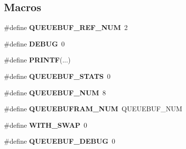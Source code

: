 \subsection*{Macros}
\begin{DoxyCompactItemize}
\item 
\hypertarget{group__rimequeuebuf_ga95d59c9802dfe6307e7742b0ca9d54b3}{}\#define {\bfseries Q\+U\+E\+U\+E\+B\+U\+F\+\_\+\+R\+E\+F\+\_\+\+N\+U\+M}~2\label{group__rimequeuebuf_ga95d59c9802dfe6307e7742b0ca9d54b3}

\item 
\hypertarget{group__rimequeuebuf_gad72dbcf6d0153db1b8d8a58001feed83}{}\#define {\bfseries D\+E\+B\+U\+G}~0\label{group__rimequeuebuf_gad72dbcf6d0153db1b8d8a58001feed83}

\item 
\hypertarget{group__rimequeuebuf_ga1f464e950a4fa11e8821b5c725921a15}{}\#define {\bfseries P\+R\+I\+N\+T\+F}(...)\label{group__rimequeuebuf_ga1f464e950a4fa11e8821b5c725921a15}

\item 
\hypertarget{group__rimequeuebuf_ga76f25cfbf0138249b597fddf41a2c8d5}{}\#define {\bfseries Q\+U\+E\+U\+E\+B\+U\+F\+\_\+\+S\+T\+A\+T\+S}~0\label{group__rimequeuebuf_ga76f25cfbf0138249b597fddf41a2c8d5}

\item 
\hypertarget{group__rimequeuebuf_ga8694cf2673912ad458fb765575c1b388}{}\#define {\bfseries Q\+U\+E\+U\+E\+B\+U\+F\+\_\+\+N\+U\+M}~8\label{group__rimequeuebuf_ga8694cf2673912ad458fb765575c1b388}

\item 
\hypertarget{group__rimequeuebuf_gab5dafcb5f705f18d60dcc75e09d3e934}{}\#define {\bfseries Q\+U\+E\+U\+E\+B\+U\+F\+R\+A\+M\+\_\+\+N\+U\+M}~Q\+U\+E\+U\+E\+B\+U\+F\+\_\+\+N\+U\+M\label{group__rimequeuebuf_gab5dafcb5f705f18d60dcc75e09d3e934}

\item 
\hypertarget{group__rimequeuebuf_ga22b8ed0f3d32e87348d7f7a45a91155f}{}\#define {\bfseries W\+I\+T\+H\+\_\+\+S\+W\+A\+P}~0\label{group__rimequeuebuf_ga22b8ed0f3d32e87348d7f7a45a91155f}

\item 
\hypertarget{group__rimequeuebuf_ga1e7eae42ff3220a5ae85bc0f3afd8920}{}\#define {\bfseries Q\+U\+E\+U\+E\+B\+U\+F\+\_\+\+D\+E\+B\+U\+G}~0\label{group__rimequeuebuf_ga1e7eae42ff3220a5ae85bc0f3afd8920}

\end{DoxyCompactItemize}
